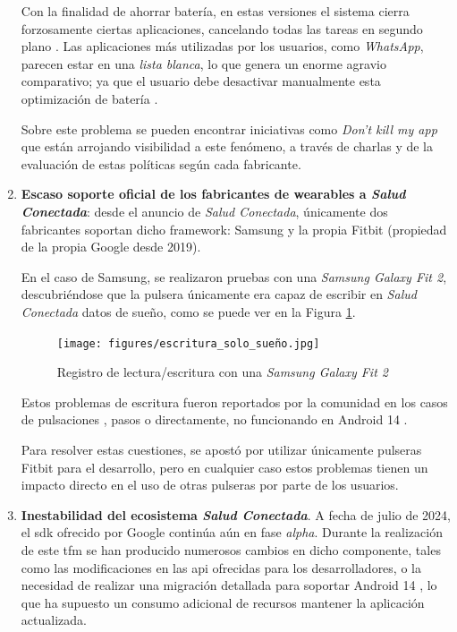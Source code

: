 \begin{enumerate}
        Con la finalidad de ahorrar batería, en estas versiones el sistema cierra forzosamente ciertas aplicaciones, cancelando todas las tareas en segundo plano \cite{manohar_is_2020}. Las aplicaciones más utilizadas por los usuarios, como \textit{WhatsApp}, parecen estar en una \textit{lista blanca}, lo que genera un enorme agravio comparativo; ya que el usuario debe desactivar manualmente esta optimización de batería \cite{shukla_work_2021}.
    
        Sobre este problema se pueden encontrar iniciativas como \textit{Don't kill my app} \cite{dont_kill_my_app_our_nodate} que están arrojando visibilidad a este fenómeno, a través de charlas y de la evaluación de estas políticas según cada fabricante.
    
        \item \textbf{Escaso soporte oficial de los fabricantes de \glspl{wearable} a \textit{Salud Conectada}}: desde el anuncio de \textit{Salud Conectada}, únicamente dos fabricantes soportan dicho \gls{framework}: Samsung y la propia Fitbit (propiedad de la propia Google desde 2019). 
        
        En el caso de Samsung, se realizaron pruebas con una \textit{Samsung Galaxy Fit 2}, descubriéndose que la pulsera únicamente era capaz de escribir en \textit{Salud Conectada} datos de sueño, como se puede ver en la Figura \ref{figure:problemas:samsung_sueño}.
    
        \begin{figure}[h]
            \centering
            \texttt{[image: figures/escritura\_solo\_sueño.jpg]}
            \caption{Registro de lectura/escritura con una \textit{Samsung Galaxy Fit 2}}
            \label{figure:problemas:samsung_sueño}
        \end{figure}
    
        Estos problemas de escritura fueron reportados por la comunidad en los casos de pulsaciones \cite{jauwaadshams_heart_2023}, pasos \cite{ste1603137554_samsung_2022} o directamente, no funcionando en Android 14 \cite{muzzas_samsung_2023}.
    
        Para resolver estas cuestiones, se apostó por utilizar únicamente pulseras Fitbit para el desarrollo, pero en cualquier caso estos problemas tienen un impacto directo en el uso de otras pulseras por parte de los usuarios.
        
        \item \textbf{Inestabilidad del ecosistema \textit{Salud Conectada}}. A fecha de julio de 2024, el \gls{sdk} ofrecido por Google continúa aún en fase \textit{alpha}. Durante la realización de este \gls{tfm} se han producido numerosos cambios en dicho componente, tales como las modificaciones en las \gls{api} ofrecidas para los desarrolladores, o la necesidad de realizar una migración detallada para soportar Android 14 \cite{android_developers_migrate_nodate}, lo que ha supuesto un consumo adicional de recursos mantener la aplicación actualizada.
    

\end{enumerate}
